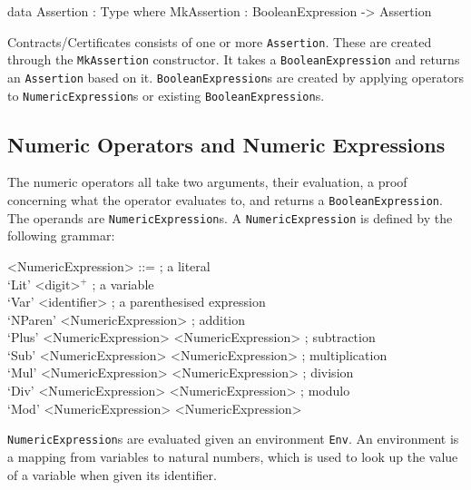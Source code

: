         \begin{code}[label={des:assertion}, caption={The \texttt{Assertion} data type}]
            data Assertion  : Type where
                MkAssertion : BooleanExpression -> Assertion
        \end{code}
    
        Contracts/Certificates consists of one or more \texttt{Assertion}.
        These are created through the \texttt{MkAssertion} constructor. It takes a \texttt{BooleanExpression} and returns an \texttt{Assertion} based on it. \texttt{BooleanExpression}s are created by applying operators to \texttt{NumericExpression}s or existing \texttt{BooleanExpression}s.
    
    \subsection{Numeric Operators and Numeric Expressions}
        The numeric operators all take two arguments, their evaluation, a proof concerning what the operator evaluates to, and returns a \texttt{BooleanExpression}.
        The operands are \texttt{NumericExpression}s. A \texttt{NumericExpression} is defined by the following grammar:
        \setlength{\grammarindent}{12em}
        \begin{grammar}
            <NumericExpression>
            ::=  ; a literal\\
                 `Lit' <digit>$^+$
            \alt ; a variable\\
                 `Var' <identifier>
            \alt ; a parenthesised expression\\
                 `NParen' <NumericExpression>
            \alt ; addition\\
                 `Plus' <NumericExpression> <NumericExpression>
            \alt ; subtraction\\
                 `Sub' <NumericExpression> <NumericExpression>
            \alt ; multiplication\\
                 `Mul' <NumericExpression> <NumericExpression>
            \alt ; division\\
                 `Div' <NumericExpression> <NumericExpression>
            \alt ; modulo\\
                 `Mod' <NumericExpression> <NumericExpression>
        \end{grammar}
        \texttt{NumericExpression}s are evaluated given an environment \texttt{Env}. An environment is a mapping from variables to natural numbers, which is used to look up the value of a variable when given its identifier.

